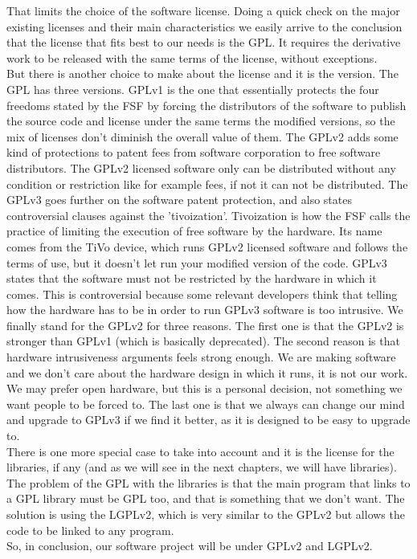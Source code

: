 That limits the choice of the software license. Doing a quick check on the major existing licenses and their main characteristics we 
easily arrive to the conclusion that the license that fits best to our needs is the GPL. It requires the derivative work to be released
with the same terms of the license, without exceptions.\\
But there is another choice to make about the license and it is the version. The GPL has three versions. GPLv1 is the one that essentially
protects the four freedoms stated by the FSF by forcing the distributors of the software to publish the source code and license under
the same terms the modified versions, so the mix of licenses don't diminish the overall value of them. The GPLv2 adds some kind of 
protections to patent fees from software corporation to free software distributors. The GPLv2 licensed software only can be distributed 
without any condition or restriction like for example fees, if not it can not be distributed. The GPLv3 goes further on the software patent 
protection, and also states controversial clauses against the 'tivoization'. Tivoization is how the FSF calls the practice of limiting 
the execution of free software by the hardware. Its name comes from the TiVo device, which runs GPLv2 licensed software and follows the
terms of use, but it doesn't let run your modified version of the code. GPLv3 states that the software must not be restricted by the 
hardware in which it comes\cite{rms:gplv3}. This is controversial because some relevant developers think that telling how the hardware 
has to be in order to run GPLv3 software is too intrusive\cite{k:gplv2}.
We finally stand for the GPLv2 for three reasons. The first one is that the GPLv2 is stronger than GPLv1 (which is basically deprecated).
The second reason is that hardware intrusiveness arguments feels strong enough. We are making software and we don't care about the hardware
design in which it runs, it is not our work. We may prefer open hardware, but this is a personal decision, not something we want people to
be forced to. The last one is that we always can change our mind and upgrade to GPLv3 if we find it better, as it is designed to be easy 
to upgrade to.\\
There is one more special case to take into account and it is the license for the libraries, if any (and as we will see in the next 
chapters, we will have libraries). The problem of the GPL with the libraries is that the main program that links to a GPL library must be
GPL too, and that is something that we don't want. The solution is using the LGPLv2, which is very similar to the GPLv2 but allows the 
code to be linked to any program.\\
So, in conclusion, our software project will be under GPLv2 and LGPLv2.
